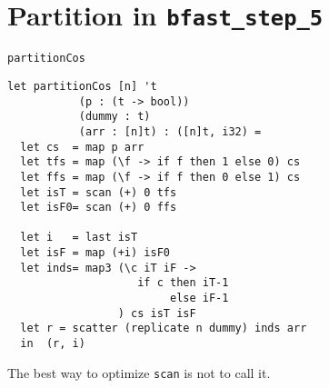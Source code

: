 \section{Partition in \texttt{bfast\_step\_5}} %


%


\begin{frame}[fragile]{\texttt{partitionCos}}

    \begin{verbatim}
let partitionCos [n] 't
           (p : (t -> bool))
           (dummy : t)
           (arr : [n]t) : ([n]t, i32) =
  let cs  = map p arr
  let tfs = map (\f -> if f then 1 else 0) cs
  let ffs = map (\f -> if f then 0 else 1) cs
  let isT = scan (+) 0 tfs
  let isF0= scan (+) 0 ffs

  let i   = last isT
  let isF = map (+i) isF0
  let inds= map3 (\c iT iF ->
                    if c then iT-1
                         else iF-1
                 ) cs isT isF
  let r = scatter (replicate n dummy) inds arr
  in  (r, i)
  \end{verbatim}

  \pause

  The best way to optimize \texttt{scan} is not to call it.

\end{frame}


